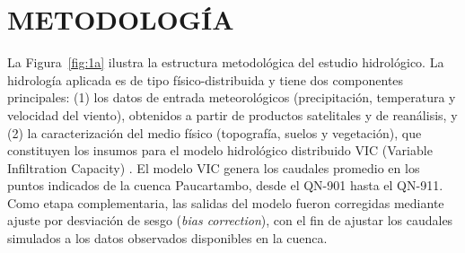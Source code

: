 \section{METODOLOGÍA}\label{section:Methodology}

La Figura~\ref{fig:1a} ilustra la estructura metodológica del estudio
hidrológico. La hidrología aplicada es de tipo físico-distribuida y tiene dos
componentes principales: (1) los datos de entrada meteorológicos (precipitación,
temperatura y velocidad del viento), obtenidos a partir de productos satelitales
y de reanálisis, y (2) la caracterización del medio físico (topografía, suelos y
vegetación), que constituyen los insumos para el modelo hidrológico distribuido VIC (Variable Infiltration Capacity) \parencite{liang1994simple}. El
modelo VIC genera los caudales promedio en los puntos indicados de la cuenca
Paucartambo, desde el QN-901 hasta el QN-911. Como etapa complementaria, las
salidas del modelo fueron corregidas mediante ajuste por desviación de sesgo
(\textit{bias correction}), con el fin de ajustar los caudales simulados a los
datos observados disponibles en la cuenca.

